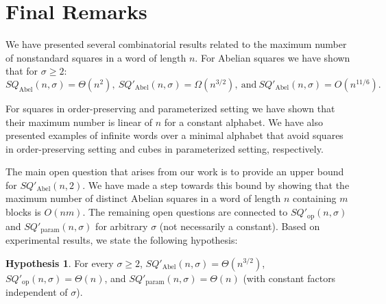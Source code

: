 \documentclass{article}
\theoremstyle{plain}
\theoremstyle{definition}
\newtheorem{hypothesis}[theorem]{Hypothesis}
\theoremstyle{remark}
\newcommand{\SQ}{\mathit{SQ}}
\newcommand{\SQABEL}{\SQ_{\mathrm{Abel}}}
\newcommand{\SQPABEL}{\SQ'_{\mathrm{Abel}}}
\newcommand{\SQPPARAM}{\SQ'_{\mathrm{param}}}
\newcommand{\SQPOP}{\SQ'_{\mathrm{op}}}
\begin{document}
  \section{Final Remarks}
  We have presented several combinatorial results related to the maximum number of
  nonstandard squares in a word of length $n$.
  For Abelian squares we have shown that for $\sigma\ge 2$:
  \[\SQABEL(n,\sigma)=\Theta(n^2),\ \SQPABEL(n,\sigma)=\Omega(n^{3/2}),\ \mbox{and}\ \SQPABEL(n,\sigma) = O(n^{11/6}).\]

  For squares in order-preserving and parameterized setting we have shown
  that their maximum number is linear of $n$ for a constant alphabet.
  We have also presented examples of infinite words over a minimal alphabet that avoid squares in
  order-preserving setting and cubes in parameterized setting, respectively.

  The main open question that arises from our work is to provide an upper bound for $\SQPABEL(n,2)$.
  We have made a step towards this bound by showing that the maximum number of distinct Abelian squares
  in a word of length $n$ containing $m$ blocks is $O(nm)$.
  The remaining open questions are connected to $\SQPOP(n,\sigma)$ and $\SQPPARAM(n,\sigma)$
  for arbitrary $\sigma$ (not necessarily a constant).
  Based on experimental results, we state the following hypothesis:
\begin{hypothesis}
   For every $\sigma \ge 2$,
  $\SQPABEL(n,\sigma) = \Theta(n^{3/2})$, $\SQPOP(n,\sigma)=\Theta(n)$, and $\SQPPARAM(n,\sigma)=\Theta(n)$
  (with constant factors independent of $\sigma$).
\end{hypothesis}

\begin{comment}
  A tempting idea effectively used for ordinary squares would be to consider only the \emph{last occurrence}
  of each type of Abelian square and show that the maximum number of such occurrences starting at the same position
  of the word (or sharing the same middle interposition) is small.
  Unfortunately, this number can be large, e.g.,
  the word $$w_1(n)\; = \;1 0^n 1 0^n$$ of length $2n+2$ contains $\Theta(n)$ different square vectors $(a,2)$,
  each corresponding to a last occurrence of Abelian square at the first position,
  whereas the word $$w_2(n)\;=\;0^n 1 1 0^n,$$ also of length $2n+2$, contains last occurrences of $n+1$ different
  Abelian squares centered at its center.
  Another idea could be to try to bound the maximum number of nonequivalent (long) Abelian squares in a word of the same length.
  However, this number also can be large, e.g.\ the word $$w_3(n)\;=\;0^n 1^n (01)^n 1^n$$ of length $5n$
  contains $n/2$ nonequivalent Abelian squares of length $2n$ (namely, $(n,n)$, $(n-1,n+1)$, \ldots, $(n-n/2,n+n/2)$).
\end{comment}




\end{document}
